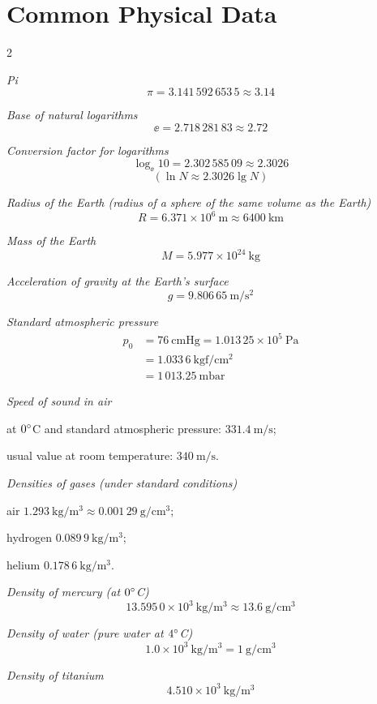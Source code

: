 \section*{Common Physical Data}

\begin{multicols}{2}
\footnotesize
\raggedcolumns
\setlength{\parindent}{0pt}

\textit{Pi}
\[
\pi=3.141\,592\,653\,5\approx 3.14
\]

\textit{Base of natural logarithms}
\[
\ee=2.718\,281\,83\approx 2.72
\]

\textit{Conversion factor for logarithms}
\[
\log_{\ee}10=2.302\,585\,09\approx 2.3026
\]
\[
(\ln N\approx 2.3026\lg N)
\]

\textit{Radius of the Earth (radius of a sphere of the same volume as the Earth)}
\[
R=6.371\times10^{6}\ \mathrm{m}\approx 6400\ \mathrm{km}
\]

\textit{Mass of the Earth}
\[
M=5.977\times10^{24}\ \mathrm{kg}
\]

\textit{Acceleration of gravity at the Earth's surface}
\[
g=9.806\,65\ \mathrm{m/s^2}
\]

\textit{Standard atmospheric pressure}
\[
\begin{aligned}
p_0&=76\ \mathrm{cmHg}=1.013\,25\times10^{5}\ \mathrm{Pa}\\
&=1.033\,6\ \mathrm{kgf/cm^2}\\
&=1\,013.25\ \mathrm{mbar}
\end{aligned}
\]

\textit{Speed of sound in air}

at $0^{\circ}$C and standard atmospheric pressure: $331.4\ \mathrm{m/s}$;

usual value at room temperature: $340\ \mathrm{m/s}$.

\textit{Densities of gases (under standard conditions)}

air $1.293\ \mathrm{kg/m^3}\approx 0.001\,29\ \mathrm{g/cm^3}$;

hydrogen $0.089\,9\ \mathrm{kg/m^3}$;

helium $0.178\,6\ \mathrm{kg/m^3}$.

\textit{Density of mercury (at $0^{\circ}$C)}
\[
13.595\,0\times10^{3}\ \mathrm{kg/m^3}\approx 13.6\ \mathrm{g/cm^3}
\]

\columnbreak

\textit{Density of water (pure water at $4^{\circ}$C)}
\[
1.0\times10^{3}\ \mathrm{kg/m^3}=1\ \mathrm{g/cm^3}
\]

\textit{Density of titanium}
\[
4.510\times10^{3}\ \mathrm{kg/m^3}
\]


\end{multicols}
